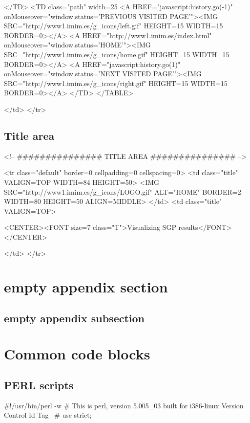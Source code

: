\documentclass[11pt]{article}
\def\nwendcode{\endtrivlist \endgroup} %
\let\nwdocspar=\par                    %
\newcommand{\sctn}[1]{\section{#1}}
\newcommand{\subsctn}[1]{\subsection{#1}}
\begin{document}
</TD>
<TD class="path" width=25%
<A HREF="javascript:history.go(-1)" onMouseover="window.status='PREVIOUS VISITED PAGE'"><IMG SRC="http://www1.imim.es/g_icons/left.gif" HEIGHT=15 WIDTH=15 BORDER=0></A>
<A HREF="http://www1.imim.es/index.html" onMouseover="window.status='HOME'"><IMG SRC="http://www1.imim.es/g_icons/home.gif" HEIGHT=15 WIDTH=15 BORDER=0></A>
<A HREF="javascript:history.go(1)" onMouseover="window.status='NEXT VISITED PAGE'"><IMG SRC="http://www1.imim.es/g_icons/right.gif" HEIGHT=15 WIDTH=15 BORDER=0></A>
</TD>
</TABLE>

</td>
</tr>
\nwendcode{}\nwdocspar

\subsctn{Title area}

\nwenddocs{}\endmoddef
<!-- ############### TITLE AREA ############### -->

<tr class="default" border=0 cellpadding=0 cellspacing=0>
<td class="title" VALIGN=TOP WIDTH=84 HEIGHT=50>
<IMG SRC="http://www1.imim.es/g_icons/LOGO.gif" ALT="HOME" BORDER=2 WIDTH=80 HEIGHT=50 ALIGN=MIDDLE>
</td>
<td class="title" VALIGN=TOP>

<CENTER><FONT size=7 class="T">Visualizing SGP results</FONT></CENTER>

</td>
</tr>
\nwendcode{}\nwdocspar

\sctn{empty appendix section}

\subsctn{empty appendix subsection}

\begin{comment}
\end{comment}

\newpage

\sctn{Common code blocks}

\subsctn{PERL scripts}

\nwenddocs{}\endmoddef
#!/usr/bin/perl -w
# This is perl, version 5.005_03 built for i386-linux
\LA{}Version Control Id Tag~{\nwtagstyle{}}\RA{}
#
use strict;
\nwendcode{}\nwdocspar
\end{document}
